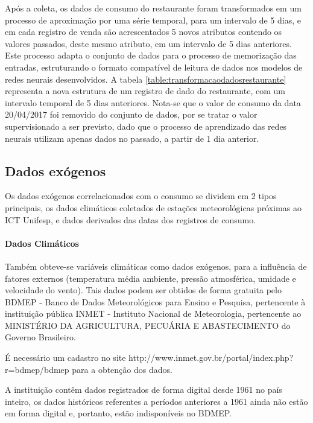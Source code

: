 \documentclass[	12pt, Times, openright, twoside, a4paper, english, brazil]{abntex2}
\begin{document}
            Após a coleta, os dados de consumo do restaurante foram transformados em um processo de aproximação por uma série temporal, para um intervalo de 5 dias, e em cada registro de venda são acrescentados 5 novos atributos contendo os valores passados, deste mesmo atributo, em um intervalo de 5 dias anteriores. Este processo adapta o conjunto de dados para o processo de memorização das entradas, estruturando o formato compatível de leitura de dados nos modelos de redes neurais desenvolvidos. A tabela \ref{table:transformacaodadosrestaurante} representa a nova estrutura de um registro de dado do restaurante, com um intervalo temporal de 5 dias anteriores. Nota-se que o valor de consumo da data 20/04/2017 foi removido do conjunto de dados, por se tratar o valor supervisionado a ser previsto, dado que o processo de aprendizado das redes neurais utilizam apenas dados no passado, a partir de 1 dia anterior.
            
           
        \subsection{Dados exógenos}
            Os dados exógenos correlacionados com o consumo se dividem em 2 tipos principais, os dados climáticos coletados de estações meteorológicas próximas ao ICT Unifesp, e dados derivados das datas dos registros de consumo.
            
            \paragraph{Dados Climáticos}
            	Também obteve-se variáveis climáticas como dados exógenos, para a influência de fatores externos (temperatura média ambiente, pressão atmosférica, umidade e velocidade do vento). Tais dados podem ser obtidos de forma gratuita pelo BDMEP - Banco de Dados Meteorológicos para Ensino e Pesquisa, pertencente à instituição pública INMET - Instituto Nacional de Meteorologia, pertencente ao MINISTÉRIO DA AGRICULTURA, PECUÁRIA E ABASTECIMENTO do Governo Brasileiro. 
            	
            	É necessário um cadastro no site http://www.inmet.gov.br/portal/index.php?r=bdmep/bdmep para a obtenção dos dados. 
            	
            	A instituição contêm dados registrados de forma digital desde 1961 no país inteiro, os dados históricos referentes a períodos anteriores a 1961 ainda não estão em forma digital e, portanto, estão indisponíveis no BDMEP.
            	
\end{document}
